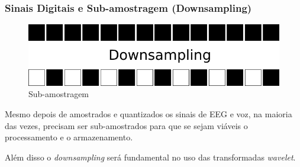 \begin{frame}
	\frametitle{Sinais Digitais e Sub-amostragem (Downsampling)}
	\begin{figure}
		\centering
		\includegraphics[width=0.5\linewidth]{../monography/images/downsampling}
		\caption{Sub-amostragem}
		\label{fig:downsampling}
	\end{figure}
	\par Mesmo depois de amostrados e quantizados \cite{haykin2011sistemas} os sinais de EEG e voz, na maioria das vezes, precisam ser sub-amostrados para que se sejam viáveis o processamento e o armazenamento\cite{robi2003}.
	
	\par Além disso o \textit{downsampling} será fundamental no uso das transformadas \textit{wavelet}.
\end{frame}